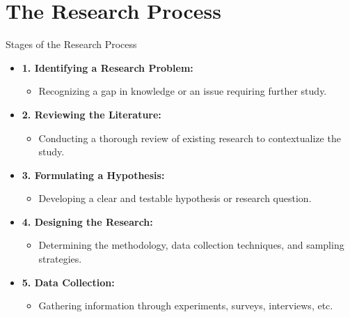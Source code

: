 \documentclass{beamer}
\begin{document}
	\section{The Research Process}
	\begin{frame}{Stages of the Research Process}
		\begin{itemize}
			\item \textbf{1. Identifying a Research Problem:}
			\begin{itemize}
				\item Recognizing a gap in knowledge or an issue requiring further study.
			\end{itemize}
			\item \textbf{2. Reviewing the Literature:}
			\begin{itemize}
				\item Conducting a thorough review of existing research to contextualize the study.
			\end{itemize}
			\item \textbf{3. Formulating a Hypothesis:}
			\begin{itemize}
				\item Developing a clear and testable hypothesis or research question.
			\end{itemize}
			\item \textbf{4. Designing the Research:}
			\begin{itemize}
				\item Determining the methodology, data collection techniques, and sampling strategies.
			\end{itemize}
			\item \textbf{5. Data Collection:}
			\begin{itemize}
				\item Gathering information through experiments, surveys, interviews, etc.
			\end{itemize}
		\end{itemize}
	\end{frame}
	
\end{document}
